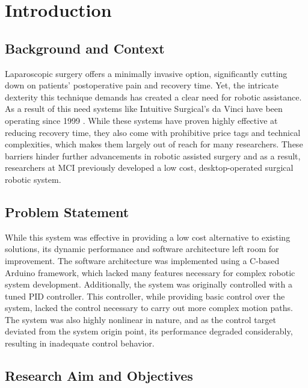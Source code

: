 \chapter{Introduction}


\section{Background and Context}
\label{section:background}

Laparoscopic surgery offers a minimally invasive option, significantly cutting down on patients' postoperative pain and recovery time. Yet, the intricate dexterity this technique demands has created a clear need for robotic assistance. As a result of this need systems like Intuitive Surgical's da Vinci have been operating since 1999 \cite{Lanfranco2004RoboticSurgery}. While these systems have proven highly effective at reducing recovery time, they also come with prohibitive price tags and technical complexities, which makes them largely out of reach for many researchers. These barriers hinder further advancements in robotic assisted surgery and as a result, researchers at MCI previously developed a low cost, desktop-operated surgical robotic system.

\section{Problem Statement}
\label{section:problem_statement}

While this system was effective in providing a low cost alternative to existing solutions, its dynamic performance and software architecture left room for improvement. The software architecture was implemented using a C-based Arduino framework, which lacked many features necessary for complex robotic system development. Additionally, the system was originally controlled with a tuned PID controller. This controller, while providing basic control over the system, lacked the control necessary to carry out more complex motion paths. The system was also highly nonlinear in nature, and as the control target deviated from the system origin point, its performance degraded considerably, resulting in inadequate control behavior.

\section{Research Aim and Objectives}
\label{section:objectives}

